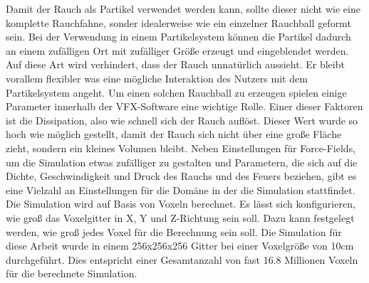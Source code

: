 Damit der Rauch als Partikel verwendet werden kann, sollte dieser nicht wie eine komplette Rauchfahne, sonder idealerweise wie ein einzelner Rauchball geformt sein.
Bei der Verwendung in einem Partikelsystem können die Partikel dadurch an einem zufälligen Ort mit zufälliger Größe erzeugt und eingeblendet werden. Auf diese
Art wird verhindert, dass der Rauch unnatürlich aussieht. Er bleibt vorallem flexibler was eine mögliche Interaktion des Nutzers mit dem Partikelsystem angeht.
Um einen solchen Rauchball zu erzeugen spielen einige Parameter innerhalb der VFX-Software eine wichtige Rolle. Einer dieser Faktoren ist die Dissipation, also
wie schnell sich der Rauch auflöst. Dieser Wert wurde so hoch wie möglich gestellt, damit der Rauch sich nicht über eine große Fläche zieht, sondern ein kleines Volumen
bleibt. Neben Einstellungen für Force-Fields, um die Simulation etwas zufälliger zu gestalten und Parametern, die sich auf die Dichte, Geschwindigkeit und Druck des Rauchs
und des Feuers beziehen, gibt es eine Vielzahl an Einstellungen für die Domäne in der die Simulation stattfindet. Die Simulation wird auf Basis von Voxeln berechnet.
Es lässt sich konfigurieren, wie groß das Voxelgitter in X, Y und Z-Richtung sein soll. Dazu kann festgelegt werden, wie groß jedes Voxel für die Berechnung sein soll.
Die Simulation für diese Arbeit wurde in einem 256x256x256 Gitter bei einer Voxelgröße von 10cm durchgeführt. Dies entspricht einer Gesamtanzahl von fast 16.8 Millionen Voxeln
für die berechnete Simulation.


